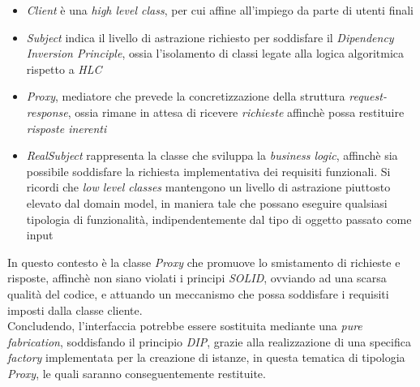 \documentclass{article}
\begin{document}
\begin{itemize}[label={-}]
    \itemsep0em
\item \textit{Client} è una \textit{high level class}, per cui affine all'impiego da parte di utenti finali
    \item \textit{Subject} indica il livello di astrazione richiesto per soddisfare il \textit{Dipendency Inversion Principle}, ossia l'isolamento di classi legate alla logica algoritmica rispetto a \textit{HLC}
    \item \textit{Proxy}, mediatore che prevede la concretizzazione della struttura \textit{request-response}, ossia rimane in attesa di ricevere \textit{richieste} affinchè possa restituire \textit{risposte inerenti}
    \item \textit{RealSubject} rappresenta la classe che sviluppa la \textit{business logic}, affinchè sia possibile soddisfare la richiesta implementativa dei requisiti funzionali. Si ricordi che \textit{low level classes} mantengono un livello di astrazione piuttosto elevato dal domain model, in maniera tale che possano eseguire qualsiasi tipologia di funzionalità, indipendentemente dal tipo di oggetto passato come input
\end{itemize}
In questo contesto è la classe \textit{Proxy} che promuove lo smistamento di richieste e risposte, affinchè non siano violati i principi \textit{SOLID}, ovviando ad una scarsa qualità del codice, e attuando un meccanismo che possa soddisfare i requisiti imposti dalla classe cliente.\vspace*{14pt}\\
Concludendo, l'interfaccia potrebbe essere sostituita mediante una \textit{pure fabrication}, soddisfando il principio \textit{DIP}, grazie alla realizzazione di una specifica \textit{factory} implementata per la creazione di istanze, in questa tematica di tipologia \textit{Proxy}, le quali saranno conseguentemente restituite.
\end{document}
